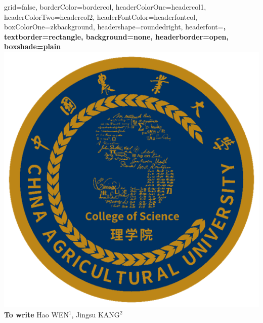 \documentclass[a0paper,portrait]{baposter}
\begin{document}

\begin{poster}{
grid=false,
borderColor=bordercol, %
headerColorOne=headercol1, %
headerColorTwo=headercol2, %
headerFontColor=headerfontcol, %
boxColorOne=zkbackground,
headershape=roundedright, %
headerfont=\Large\sf\bf, %
textborder=rectangle,
background=none,
headerborder=open, %
boxshade=plain
}
%
%
{\includegraphics[scale=0.401]{images/logo_cau_science.png}} %
{
{\bf \fontsize{19pt}{19pt} \selectfont To write}
} %
{\vspace{0.3em} \smaller Hao WEN$^1$, Jingsu KANG$^2$  \\  %

}
\end{poster}
\end{document}
